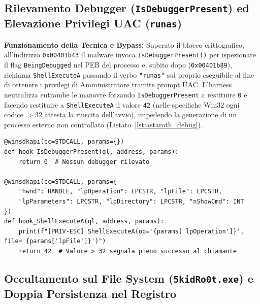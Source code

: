\documentclass[11pt, a4paper]{article}
\begin{document}
\subsection{Rilevamento Debugger (\texttt{IsDebuggerPresent}) ed Elevazione Privilegi UAC (\texttt{runas})}

\textbf{Funzionamento della Tecnica e Bypass:} Superato il blocco crittografico, all'indirizzo \texttt{0x00401b43} il malware invoca \texttt{Is\allowbreak{}Debugger\allowbreak{}Present()} per ispezionare il flag \texttt{Being\allowbreak{}Debugged} nel PEB del processo e, subito dopo (\texttt{0x00401b89}), richiama \texttt{Shell\allowbreak{}ExecuteA} passando il verbo \texttt{"runas"} sul proprio eseguibile al fine di ottenere i privilegi di Amministratore tramite prompt UAC. L'harness neutralizza entrambe le manovre forzando \texttt{Is\allowbreak{}Debugger\allowbreak{}Present} a restituire \texttt{0} e facendo restituire a \texttt{Shell\allowbreak{}ExecuteA} il valore \texttt{42} (nelle specifiche Win32 ogni codice $> 32$ attesta la riuscita dell'avvio), impedendo la generazione di un processo esterno non controllato (Listato~\ref{lst:astaroth_debug}).

\begin{lstlisting}[style=pythoncode, caption={Bypass del controllo anti-debug e simulazione del successo dell'elevazione privilegi UAC.}, label={lst:astaroth_debug}]
@winsdkapi(cc=STDCALL, params={})
def hook_IsDebuggerPresent(ql, address, params):
    return 0  # Nessun debugger rilevato

@winsdkapi(cc=STDCALL, params={
    "hwnd": HANDLE, "lpOperation": LPCSTR, "lpFile": LPCSTR,
    "lpParameters": LPCSTR, "lpDirectory": LPCSTR, "nShowCmd": INT
})
def hook_ShellExecuteA(ql, address, params):
    print(f"[PRIV-ESC] ShellExecuteA(op='{params['lpOperation']}', file='{params['lpFile']}')")
    return 42  # Valore > 32 segnala pieno successo al chiamante
\end{lstlisting}

\subsection{Occultamento sul File System (\texttt{5kidRo0t.exe}) e Doppia Persistenza nel Registro}
\end{document}
